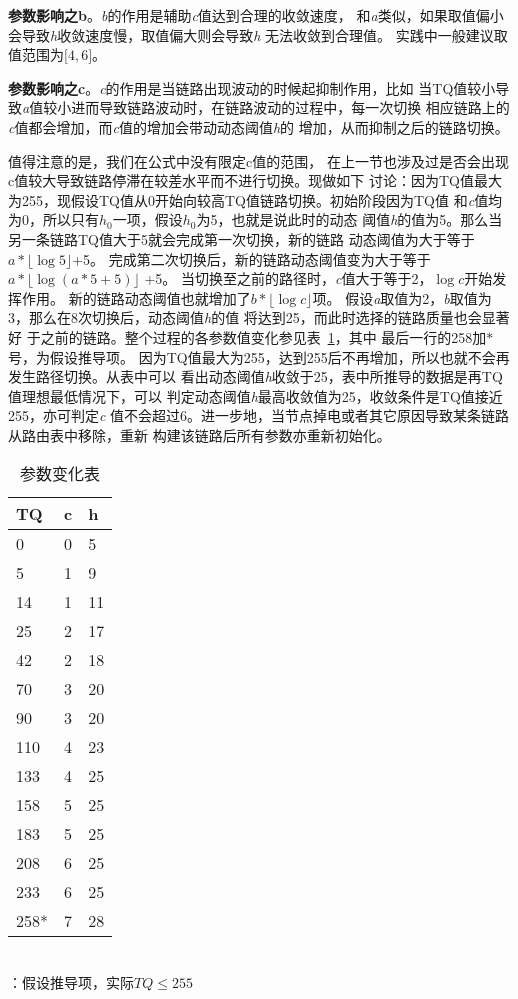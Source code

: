 \textbf{参数影响之b}。\emph{b}的作用是辅助\emph{c}值达到合理的收敛速度，
和\emph{a}类似，如果取值偏小会导致\emph{h}收敛速度慢，取值偏大则会导致\emph{h}
无法收敛到合理值。
实践中一般建议取值范围为$\lbrack4,6\rbrack$。


\textbf{参数影响之c}。\emph{c}的作用是当链路出现波动的时候起抑制作用，比如
当TQ值较小导致\emph{a}值较小进而导致链路波动时，在链路波动的过程中，每一次切换
相应链路上的\emph{c}值都会增加，而\emph{c}值的增加会带动动态阈值\emph{h}的
增加，从而抑制之后的链路切换。

值得注意的是，我们在公式中没有限定c值的范围，
在上一节也涉及过是否会出现c值较大导致链路停滞在较差水平而不进行切换。现做如下
讨论：因为TQ值最大为255，现假设TQ值从0开始向较高TQ值链路切换。初始阶段因为TQ值
和\emph{c}值均为0，所以只有$h_{0}$一项，假设$h_{0}$为5，也就是说此时的动态
阈值\emph{h}的值为5。那么当另一条链路TQ值大于5就会完成第一次切换，新的链路
动态阈值为大于等于$a*\lfloor \log 5 \rfloor$+5。
完成第二次切换后，新的链路动态阈值变为大于等于
$a*\lfloor \log(a*5+5) \rfloor$ +5。
当切换至之前的路径时，\emph{c}值大于等于2，$\log c$开始发挥作用。
新的链路动态阈值也就增加了$b*\lfloor \log c \rfloor$项。
假设\emph{a}取值为2，\emph{b}取值为3，那么在8次切换后，动态阈值\emph{h}的值
将达到25，而此时选择的链路质量也会显著好
于之前的链路。整个过程的各参数值变化参见表~\ref{tab:parameter_change}，其中
最后一行的258加$*$号，为假设推导项。
因为TQ值最大为255，达到255后不再增加，所以也就不会再发生路径切换。从表中可以
看出动态阈值\emph{h}收敛于25，表中所推导的数据是再TQ值理想最低情况下，可以
判定动态阈值\emph{h}最高收敛值为25，收敛条件是TQ值接近255，亦可判定\emph{c}
值不会超过6。进一步地，当节点掉电或者其它原因导致某条链路从路由表中移除，重新
构建该链路后所有参数亦重新初始化。

\begin{table}[htbp]
  \centering
  \caption{参数变化表}
  \label{tab:parameter_change}
  \begin{minipage}[t]{0.4\textwidth}
  \begin{tabular}{p{2cm}p{2cm}p{0.5cm}}
  \hline
  TQ & c & h\\
  \hline
  0 & 0 & 5 \\
  5 & 1 & 9 \\
  14 & 1 & 11 \\
  25 & 2 & 17 \\
  42 & 2 & 18 \\
  70 & 3 & 20 \\
  90 & 3 & 20 \\
  110 & 4 & 23 \\
  133 & 4 & 25 \\
  158 & 5 & 25 \\
  183 & 5 & 25 \\
  208 & 6 & 25 \\
  233 & 6 & 25 \\
  258* & 7 & 28 \\
  \hline
  \end{tabular}\\
  \footnotesize *：假设推导项，实际$TQ \le 255$\\
  \end{minipage}
\end{table}

